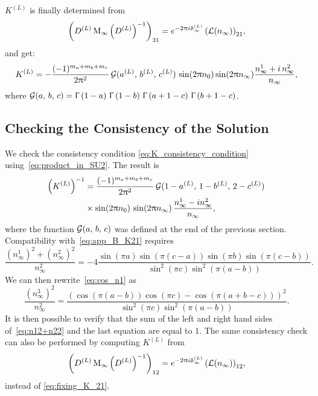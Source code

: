 $K^{(L)}$ is finally determined from
\begin{equation}
  \qty( D^{(L)}\, \mathrm{M}_{\infty}\, \qty( D^{(L)} )^{-1} )_{21}
  =
  e^{-2\uppi i \updelta_{\infty}^{(L)}}\,
  \qty( \mathcal{L}(n_{\infty}) )_{21},
  \label{eq:fixing_K_21}
\end{equation}
and get:
\begin{equation}
  K^{(L)}
  =
  -\frac{(-1)^{m_a + m_b + m_c}}{2 \uppi^2}\,
  \mathcal{G}( a^{(L)},\, b^{(L)},\, c^{(L)} )\,
  \sin(2 \uppi n_{0})
  \sin(2 \uppi n_{\infty})
  \frac{n^1_{\infty} + i\, n^2_{\infty}}{n_{\infty}},
  \label{eq:app_B_K21}
\end{equation}
where $\mathcal{G}( a,\, b,\, c ) = \Upgamma\left( 1-a \right)\, \Upgamma\left( 1-b \right)\, \Upgamma\left( a+1-c \right)\, \Upgamma\left( b+1-c \right)$.


\subsection{Checking the Consistency of the Solution}

We check the consistency condition \eqref{eq:K_consistency_condition} using~\eqref{eq:product_in_SU2}.
The result is
\begin{equation}
  \begin{split}
    \qty( K^{(L)} )^{-1}
    & =
    \frac{(-1)^{m_a + m_b + m_c}}{2 \uppi^2}\,
    \mathcal{G}(1 - a^{(L)},\, 1 - b^{(L)},\, 2 - c^{(L)})\,
    \\
    & \times
    \sin(2 \uppi n_{0})\,
    \sin(2 \uppi n_{\infty})\,
    \frac{n^1_{\infty} -i n^2_{\infty}}{n_{\infty}},
  \end{split}
  \label{eq:app_B_K12}
\end{equation}
where the function $\mathcal{G}( a,\, b,\, c )$ was defined at the end of the previous section.
Compatibility with~\eqref{eq:app_B_K21} requires
\begin{equation}
  \frac{(n^1_{\infty})^2 + (n^2_{\infty})^2}{n^2_{\infty}}
  =
  -4 \frac{\sin(\pi a) \sin(\pi(c-a))\sin(\pi b) \sin(\pi(c-b))}
          {\sin^2(\pi c) \sin^2(\pi(a-b))}.
  \label{eq:n12+n22}
\end{equation}
We can then rewrite~\eqref{eq:cos_n1} as
\begin{equation}
  \frac{(n^3_{\infty})^2}{n^2_{\infty}}
  =
  \frac{(\cos(\pi (a-b)) \cos(\pi c)- \cos(\pi(a+b-c)))^2}
       {\sin^2(\pi c) \sin^2(\pi(a-b))}.
\end{equation}
It is then possible to verify that the sum of the left and right hand sides of~\eqref{eq:n12+n22} and the last equation are equal to $1$.
The same consistency check can also be performed by computing $K^{(L)}$ from
\begin{equation}
  \qty( D^{(L)}\, \mathrm{M}_{\infty}\, \qty( D^{(L)} )^{-1} )_{12}
  =
  e^{-2\uppi i \updelta_{\infty}^{(L)}}\,
  \qty( \mathcal{L}(n_{\infty}) )_{12},
\end{equation}
instead of \eqref{eq:fixing_K_21}.

